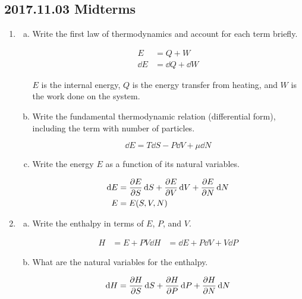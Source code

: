 \documentclass[9pt,a4paper,twocolumn]{article}
\begin{document}
\subsection{2017.11.03 Midterms}
\begin{enumerate}[1.]

	\item
	\begin{enumerate}[(a)]

		\item Write the first law of thermodynamics and account for each term briefly.
		
		\begin{align}
			E &= Q+W \\
			\dd{E} &= \dd{Q} + \dd{W}
		\end{align}
		
		$E$ is the internal energy, $Q$ is the energy transfer from heating, and $W$ is the work done on the system.
		
		\item Write the fundamental thermodynamic relation (differential form), including the term with number of particles.
		
		\begin{equation}
			\dd{E} = T\dd{S} - P\dd{V} + \mu\dd{N}
		\end{equation}
		
		\item Write the energy $E$ as a function of its natural variables.
		
		\begin{align}
			\dd{E} &= \pdv{E}{S}\dd{S} + \pdv{E}{V}\dd{V} + \pdv{E}{N}\dd{N} \\
			E &= E(S,V,N)
		\end{align}

	\end{enumerate}

	\item
	\begin{enumerate}[(a)]
	
		\item Write the enthalpy in terms of $E$, $P$, and $V$.
		
		\begin{align}
			H &= E + PV
			\dd{H} &= \dd{E} + P\dd{V} + V\dd{P}
		\end{align}
		
		\item What are the natural variables for the enthalpy.
		
		\begin{equation}
			\dd{H} = \pdv{H}{S}\dd{S} + \pdv{H}{P}\dd{P} + \pdv{H}{N}\dd{N}
		\end{equation}
		

\end{enumerate}
\end{enumerate}
\end{document}

